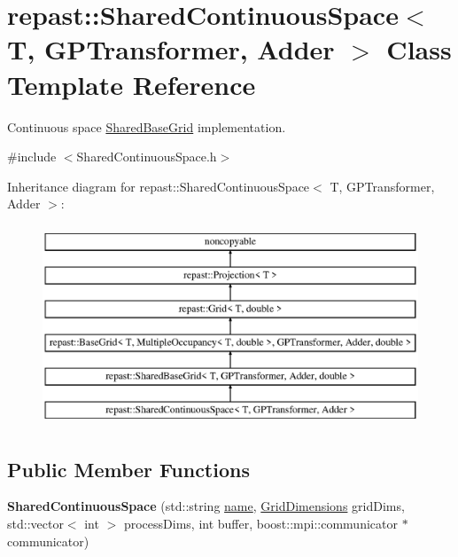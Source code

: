 \hypertarget{classrepast_1_1_shared_continuous_space}{\section{repast\-:\-:Shared\-Continuous\-Space$<$ T, G\-P\-Transformer, Adder $>$ Class Template Reference}
\label{classrepast_1_1_shared_continuous_space}
}


Continuous space \hyperlink{classrepast_1_1_shared_base_grid}{Shared\-Base\-Grid} implementation.  




{\ttfamily \#include $<$Shared\-Continuous\-Space.\-h$>$}

Inheritance diagram for repast\-:\-:Shared\-Continuous\-Space$<$ T, G\-P\-Transformer, Adder $>$\-:\begin{figure}[H]
\begin{center}
\leavevmode
\includegraphics[height=6.000000cm]{classrepast_1_1_shared_continuous_space}
\end{center}
\end{figure}
\subsection*{Public Member Functions}
\begin{DoxyCompactItemize}
\item 
\hypertarget{classrepast_1_1_shared_continuous_space_afb64fc54f0037e441e28234f350bd160}{{\bfseries Shared\-Continuous\-Space} (std\-::string \hyperlink{classrepast_1_1_projection_ab60a0ab4f584685780307d7431b61800}{name}, \hyperlink{classrepast_1_1_grid_dimensions}{Grid\-Dimensions} grid\-Dims, std\-::vector$<$ int $>$ process\-Dims, int buffer, boost\-::mpi\-::communicator $\ast$communicator)}\label{classrepast_1_1_shared_continuous_space_afb64fc54f0037e441e28234f350bd160}

\end{DoxyCompactItemize}
